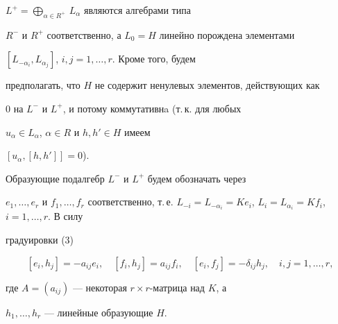 $L^+=\bigoplus\limits_{\alpha\in R^+}\,L_\alpha$ являются алгебрами типа


$R^-$ и $R^+$ соответственно, а $L_0=H$ линейно порождена элементами


$[L_{-\alpha_i},L_{\alpha_j}]$, $i,j=1,\dotsc,r$. Кроме того, будем


предполагать, что $H$ не содержит ненулевых элементов, действующих как


0 на $L^-$ и $L^+$, и потому коммутативнa (т.\,к. для любых


$u_\alpha\in L_\alpha$, $\alpha\in R$ и $h,h'\in H$ имеем


$[u_\alpha,[ h,h']]=0$).





Образующие подалгебр $L^-$ и $L^+$ будем обозначать через


$e_1,\dotsc,e_r$ и $f_1,\dotsc,f_r$ соответственно, т.\,е. $L_{-i}=


L_{-\alpha_i}=Ke_i$, $L_i=L_{\alpha_i}=Kf_i$, $i=1,\dotsc,r$. В силу


градуировки (3) 


\begin{equation}


[e_i,h_j]=-a_{ij}e_i,\quad [f_i,h_j]=a_{ij}f_i,


\quad[e_i,f_j]=-\delta_{ij}h_j,\quad i,j=1,\dotsc,r,


\end{equation}


где $A=(a_{ij})$ --- некоторая $r\times r$-матрица над $K$, а


$h_1,\dotsc,h_r$ --- линейные образующие $H$.





